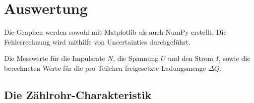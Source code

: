 \section{Auswertung}
\label{sec:Auswertung}

Die Graphen werden sowohl mit Matplotlib \cite{matplotlib} als auch NumPy \cite{numpy} erstellt. Die
Fehlerrechnung wird mithilfe von Uncertainties \cite{uncertainties} durchgeführt.

\begin{table}
	\centering
	\caption{Die Messwerte für die Impulsrate $N$, die Spannung $U$ und den Strom $I$, sowie die berechneten Werte für die pro Teilchen freigesetzte Ladungsmenge $\Delta Q$.}
	
	\label{tab:tab1}
\end{table}

\subsection{Die Zählrohr-Charakteristik}

